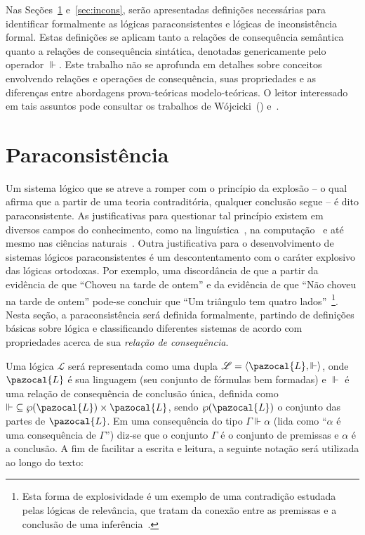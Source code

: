 Nas Seções~\ref{sec:paracons} e~\ref{sec:incons}, serão apresentadas definições necessárias para identificar formalmente as lógicas paraconsistentes e lógicas de inconsistência formal. Estas definições se aplicam tanto a relações de consequência semântica quanto a relações de consequência sintática, denotadas genericamente pelo operador $\Vdash$. Este trabalho não se aprofunda em detalhes sobre conceitos envolvendo relações e operações de consequência, suas propriedades e as diferenças entre abordagens prova-teóricas modelo-teóricas. O leitor interessado em tais assuntos pode consultar os trabalhos de Wójcicki~(\citeyear{Wojcicki1984-WJCLOP,Wojcicki1988-WOJAAT,Wojcicki1988-WOJTOL}) e~.

\section{Paraconsistência}\label{sec:paracons}
    Um sistema lógico que se atreve a romper com o princípio da explosão {--} o qual afirma que a partir de uma teoria contraditória, qualquer conclusão segue {--} é dito paraconsistente. As justificativas para questionar tal princípio existem em diversos campos do conhecimento, como na linguística~\cite{McGinnis2013-MCGTUA}, na computação~\cite{carnielli2000formal} e até mesmo nas ciências naturais~\cite{Brown2015-BROCAP-9}. Outra justificativa para o desenvolvimento de sistemas lógicos paraconsistentes é um descontentamento com o caráter explosivo das lógicas ortodoxas. Por exemplo, uma discordância de que a partir da evidência de que ``Choveu na tarde de ontem'' e da evidência de que ``Não choveu na tarde de ontem'' pode-se concluir que ``Um triângulo tem quatro lados''~\footnote{Esta forma de explosividade é um exemplo de uma contradição estudada pelas lógicas de relevância, que tratam da conexão entre as premissas e a conclusão de uma inferência~\cite{sep-logic-relevance}.}. Nesta seção, a paraconsistência será definida formalmente, partindo de definições básicas sobre lógica e classificando diferentes sistemas de acordo com propriedades acerca de sua \textit{relação de consequência}.

    Uma lógica $\mathcal{L}$ será representada como uma dupla $\mathcal{L} = \langle \pazocal{L},\Vdash \rangle$, onde $\pazocal{L}$ é sua linguagem (seu conjunto de fórmulas bem formadas) e $\Vdash$ é uma relação de consequência de conclusão única, definida como $\Vdash \;\subseteq \wp(\pazocal{L})\times\pazocal{L}$, sendo $\wp(\pazocal{L})$ o conjunto das partes de $\pazocal{L}$. Em uma consequência do tipo $\Gamma \Vdash \alpha$ (lida como ``$\alpha$ é uma consequência de $\Gamma$'') diz-se que o conjunto $\Gamma$ é o conjunto de premissas e $\alpha$ é a conclusão. A fim de facilitar a escrita e leitura, a seguinte notação será utilizada ao longo do texto:

